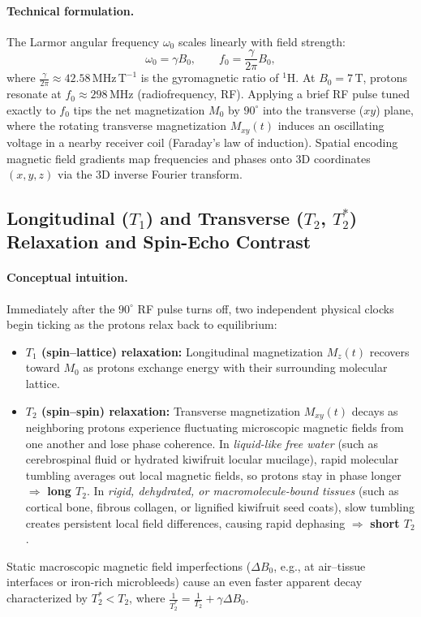 \documentclass[10pt,a4paper]{article}
\renewcommand{\_}{\origunderscore\allowbreak}
\begin{document}
\paragraph{Technical formulation.} The Larmor angular frequency $\omega_0$ scales linearly with field strength:
\begin{equation}
    \omega_0 = \gamma B_0, \qquad f_0 = \frac{\gamma}{2\pi} B_0,
    \label{eq:larmor}
\end{equation}
where $\frac{\gamma}{2\pi} \approx 42.58\,\text{MHz}\,\text{T}^{-1}$ is the gyromagnetic ratio of $^{1}\text{H}$. At $B_0 = 7\,\text{T}$, protons resonate at $f_0 \approx 298\,\text{MHz}$ (radiofrequency, RF). Applying a brief RF pulse tuned exactly to $f_0$ tips the net magnetization $M_0$ by $90^\circ$ into the transverse ($xy$) plane, where the rotating transverse magnetization $M_{xy}(t)$ induces an oscillating voltage in a nearby receiver coil (Faraday's law of induction). Spatial encoding magnetic field gradients map frequencies and phases onto 3D coordinates $(x,y,z)$ via the 3D inverse Fourier transform.

\subsection{Longitudinal ($T_1$) and Transverse ($T_2$, $T_2^*$) Relaxation and Spin-Echo Contrast}

\paragraph{Conceptual intuition.} Immediately after the $90^\circ$ RF pulse turns off, two independent physical clocks begin ticking as the protons relax back to equilibrium:
\begin{itemize}
    \item \textbf{$T_1$ (spin--lattice) relaxation:} Longitudinal magnetization $M_z(t)$ recovers toward $M_0$ as protons exchange energy with their surrounding molecular lattice.
    \item \textbf{$T_2$ (spin--spin) relaxation:} Transverse magnetization $M_{xy}(t)$ decays as neighboring protons experience fluctuating microscopic magnetic fields from one another and lose phase coherence. In \emph{liquid-like free water} (such as cerebrospinal fluid or hydrated kiwifruit locular mucilage), rapid molecular tumbling averages out local magnetic fields, so protons stay in phase longer $\Rightarrow$ \textbf{long $T_2$}. In \emph{rigid, dehydrated, or macromolecule-bound tissues} (such as cortical bone, fibrous collagen, or lignified kiwifruit seed coats), slow tumbling creates persistent local field differences, causing rapid dephasing $\Rightarrow$ \textbf{short $T_2$}.
\end{itemize}
Static macroscopic magnetic field imperfections ($\Delta B_0$, e.g., at air--tissue interfaces or iron-rich microbleeds) cause an even faster apparent decay characterized by $T_2^* < T_2$, where $\frac{1}{T_2^*} = \frac{1}{T_2} + \gamma \Delta B_0$.
\end{document}
